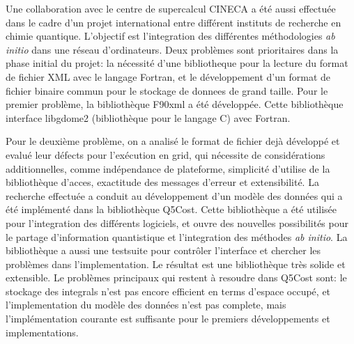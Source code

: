 Une collaboration avec le centre de supercalcul CINECA a \'et\'e aussi
effectu\'ee dans le cadre d'un projet international entre diff\'erent
instituts de recherche en chimie quantique. L'objectif est l'integration des 
diff\'erentes m\'ethodologies \textit{ab initio} dans une r\'eseau d'ordinateurs.
Deux probl\`emes sont prioritaires dans la phase initial du projet: la
n\'ecessit\'e d'une bibliotheque pour la lecture du format de fichier XML avec
le langage Fortran, et le d\'eveloppement d'un format de fichier binaire
commun pour le stockage de donnees de grand taille.
Pour le premier probl\`eme, la biblioth\`eque F90xml a \'et\'e
d\'evelopp\'ee. Cette biblioth\`eque interface libgdome2 (biblioth\`eque
pour le langage C) avec Fortran. 

Pour le deuxi\`eme probl\`eme, on a analis\'e le format de fichier dej\`a
d\'evelopp\'e et evalu\'e leur d\'efects pour l'ex\'ecution en grid, qui
n\'ecessite de consid\'erations additionnelles, comme
ind\'ependance de plateforme, simplicit\'e d'utilise de la biblioth\`eque 
d'acces, exactitude des messages d'erreur et extensibilit\'e.
La recherche effectu\'ee a conduit au d\'eveloppement d'un mod\`ele des
donn\'ees qui a \'et\'e impl\'ement\'e dans la biblioth\`eque Q5Cost. Cette
biblioth\`eque a \'et\'e utilis\'ee pour l'integration des diff\'erents logiciels,
et ouvre des nouvelles possibilit\'es pour le partage d'information
quantistique et l'integration des m\'ethodes \textit{ab initio}.
La biblioth\`eque a aussi une testsuite pour contr\^oler l'interface et
chercher les probl\`emes dans l'implementation. 
Le r\'esultat est une biblioth\`eque tr\`es solide et extensible.  Le
probl\`emes principaux qui restent \`a resoudre dans Q5Cost sont: le
stockage des integrals n'est pas encore efficient en terms d'espace
occup\'e, et l'implementation du mod\`ele des donn\'ees n'est pas complete,
mais l'impl\'ementation courante est suffisante pour le premiers
d\'eveloppements et implementations.
